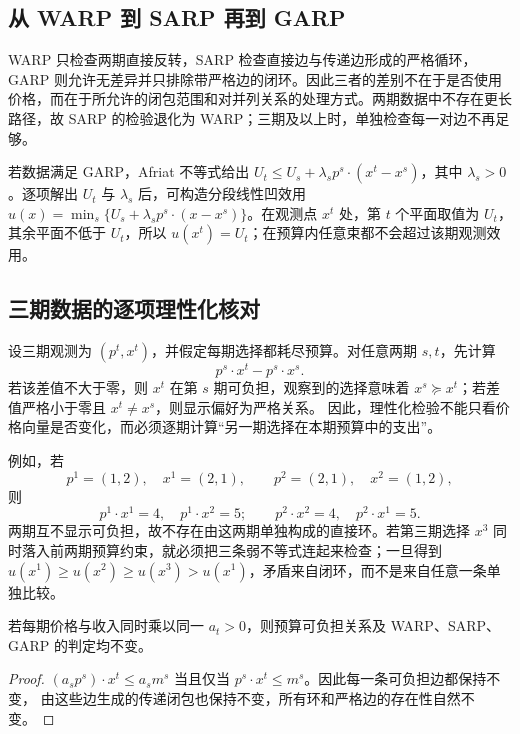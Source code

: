 \subsection{从 WARP 到 SARP 再到 GARP}
WARP 只检查两期直接反转，SARP 检查直接边与传递边形成的严格循环，GARP 则允许无差异并只排除带严格边的闭环。因此三者的差别不在于是否使用价格，而在于所允许的闭包范围和对并列关系的处理方式。两期数据中不存在更长路径，故 SARP 的检验退化为 WARP；三期及以上时，单独检查每一对边不再足够。

若数据满足 GARP，Afriat 不等式给出 $U_t\le U_s+\lambda_s p^s\cdot(x^t-x^s)$，其中 $\lambda_s>0$。逐项解出 $U_t$ 与 $\lambda_s$ 后，可构造分段线性凹效用 $u(x)=\min_s\{U_s+\lambda_s p^s\cdot(x-x^s)\}$。在观测点 $x^t$ 处，第 $t$ 个平面取值为 $U_t$，其余平面不低于 $U_t$，所以 $u(x^t)=U_t$；在预算内任意束都不会超过该期观测效用。

\subsection{三期数据的逐项理性化核对}
设三期观测为 $(p^t,x^t)$，并假定每期选择都耗尽预算。对任意两期 $s,t$，先计算
\[
 p^s\cdot x^t-p^s\cdot x^s.
\]
若该差值不大于零，则 $x^t$ 在第 $s$ 期可负担，观察到的选择意味着
$x^s\succeq x^t$；若差值严格小于零且 $x^t\ne x^s$，则显示偏好为严格关系。
因此，理性化检验不能只看价格向量是否变化，而必须逐期计算“另一期选择在本期预算中的支出”。

例如，若
\[
 p^1=(1,2),\quad x^1=(2,1),\qquad
 p^2=(2,1),\quad x^2=(1,2),
\]
则
\[
 p^1\cdot x^1=4,\quad p^1\cdot x^2=5;
 \qquad
 p^2\cdot x^2=4,\quad p^2\cdot x^1=5.
\]
两期互不显示可负担，故不存在由这两期单独构成的直接环。若第三期选择
$x^3$ 同时落入前两期预算约束，就必须把三条弱不等式连起来检查；一旦得到
$u(x^1)\ge u(x^2)\ge u(x^3)>u(x^1)$，矛盾来自闭环，而不是来自任意一条单独比较。

\begin{proposition}[尺度变换不改变显示偏好]
若每期价格与收入同时乘以同一 $a_t>0$，则预算可负担关系及 WARP、SARP、GARP 的判定均不变。
\end{proposition}
\begin{proof}
$(a_sp^s)\cdot x^t\le a_sm^s$ 当且仅当 $p^s\cdot x^t\le m^s$。因此每一条可负担边都保持不变，
由这些边生成的传递闭包也保持不变，所有环和严格边的存在性自然不变。
\end{proof}
